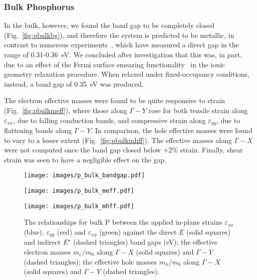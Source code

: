\subsubsection{Bulk Phosphorus}

In the bulk, however, 
we found the band gap to be completely 
closed (Fig.~\ref{fig:pbulkbg}), 
and therefore the system is predicted to be metallic, 
in contrast to 
numerous experiments~\cite{Morita1986,doi:10.1063/1.1729699,NARITA1983422,MARUYAMA198199},
which have measured a direct gap in 
the range of 0.31-0.36~eV. 
%
We concluded after investigation 
that this was, in part, 
due to an effect  
of the Fermi surface smearing functionality~\cite{PhysRevLett.82.3296} 
in the ionic geometry relaxation procedure.
%
When relaxed under fixed-occupancy 
conditions, instead, a band gap of 
0.35~eV was produced.


The electron effective masses 
were found to be quite responsive to strain 
(Fig.~\ref{fig:pbulkmeff}), 
where those along 
$\Gamma-Y$ rose for 
both tensile strain along $\varepsilon_{xx}$, 
due to falling conduction bands,  
and compressive strain along $\varepsilon_{yy}$, 
due to flattening bands along $\Gamma-Y$.
%
In comparison, the hole effective masses 
were found to vary to a lesser extent 
(Fig.~\ref{fig:pbulkmhff}).
%
The effective masses along $\Gamma-X$ 
were not computed once 
the band gap closed below $+2\%$ strain.
%
Finally, shear strain was seen  
to have a negligible effect on the gap.

\begin{figure}[th!]
\begin{subfloat}{
\texttt{[image: images/p\_bulk\_bandgap.pdf]}
  \label{fig:pbulkbg}}
\end{subfloat}
%
\begin{subfloat}[Bulk P $m_e/m_0$]{
\texttt{[image: images/p\_bulk\_meff.pdf]}
  \label{fig:pbulkmeff}}
\end{subfloat}
%
\begin{subfloat}[Bulk P $m_h/m_0$]{
\texttt{[image: images/p\_bulk\_mhff.pdf]}
  \label{fig:pbulkmhff}}
\end{subfloat}
%
\caption[Electronic properties of bulk phosphorus for in-plane strains]
{The relationships for bulk P between 
the applied in-plane strains $\varepsilon_{xx}$ (blue),
$\varepsilon_{yy}$ (red) and $\varepsilon_{xy}$ (green) against 
%
\protect{}
the direct $E$ (solid  squares) and 
indirect $E^\star$ (dashed triangles) band gaps (eV);
%
\protect{}
the effective electron masses $m_e/m_0$ 
along $\Gamma-X$ (solid squares) and 
$\Gamma-Y$ (dashed triangles);
%
\protect{} 
the effective hole masses $m_h/m_0$ 
along $\Gamma-X$ (solid squares) and 
$\Gamma-Y$ (dashed triangles).}
\label{fig:p_bulk_elec_properties}
\end{figure}


